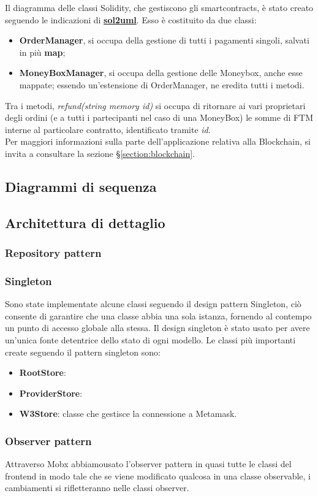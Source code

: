 Il diagramma delle classi Solidity, che gestiscono gli smartcontracts, è stato creato seguendo le indicazioni di \href{https://github.com/naddison36/sol2uml}{\textbf{sol2uml}}.
Esso è costituito da due classi:
\begin{itemize}
    \item \textbf{OrderManager}, si occupa della gestione di tutti i pagamenti singoli, salvati in più \textbf{map};
    \item \textbf{MoneyBoxManager}, si occupa della gestione delle Moneybox, anche esse mappate; essendo un'estensione di OrderManager, ne eredita tutti i metodi.
\end{itemize}
Tra i metodi, \textit{refund(string memory id)} si occupa di ritornare ai vari proprietari degli ordini 
(e a tutti i partecipanti nel caso di una MoneyBox) le somme di FTM interne al particolare contratto, identificato tramite \textit{id}.
\\
Per maggiori informazioni sulla parte dell'applicazione relativa alla Blockchain, si invita a consultare la sezione §\ref{section:blockchain}.



\subsection{Diagrammi di sequenza}

\subsection{Architettura di dettaglio}

\subsubsection{Repository pattern}



\subsubsection{Singleton}

Sono state implementate alcune classi seguendo il design pattern Singleton,
 ciò consente di garantire che una classe abbia una sola istanza, fornendo al contempo un punto di accesso globale alla stessa.
Il design singleton è stato usato per avere un'unica fonte detentrice dello stato di ogni modello.
Le classi più importanti create seguendo il pattern singleton sono:

\begin{itemize}
    \item \textbf{RootStore}: 
    \item \textbf{ProviderStore}: 
    \item \textbf{W3Store}: classe che gestisce la connessione a Metamask.
\end{itemize}

\subsubsection{Observer pattern}

Attraverso Mobx abbiamousato l'observer pattern in quasi tutte le classi del frontend in modo tale che se viene modificato qualcosa in una classe observable, i cambiamenti si rifletteranno nelle classi observer.